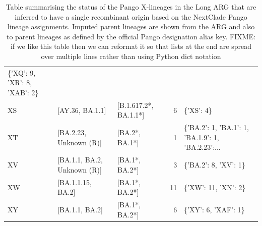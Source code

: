 \documentclass{article}
\begin{document}
\begin{table}
\begin{tabular}{lllrl}
\{'XQ': 9, 'XR': 8, 'XAB': 2\} \\
XS      &              [AY.36, BA.1.1] &  [B.1.617.2*, BA.1.1*] &   6 &
\{'XS': 4\} \\
XT      &       [BA.2.23, Unknown (R)] &         [BA.2*, BA.1*] &   1 &
\{'BA.2': 1, 'BA.1': 1, 'BA.1.9': 1, 'BA.2.23':... \\
XV      &  [BA.1.1, BA.2, Unknown (R)] &         [BA.1*, BA.2*] &   3 &
\{'BA.2': 8, 'XV': 1\} \\
XW      &            [BA.1.1.15, BA.2] &         [BA.1*, BA.2*] &  11 &
\{'XW': 11, 'XN': 2\} \\
XY      &               [BA.1.1, BA.2] &         [BA.1*, BA.2*] &   6 &
\{'XY': 6, 'XAF': 1\} \\
\bottomrule
\end{tabular}
\caption{\label{tab:pango-single-origin}
Table summarising the status of the Pango X-lineages in the Long ARG that are inferred to have a single recombinant origin based on the NextClade Pango lineage assignments. Imputed parent lineages are shown from the ARG and also to parent lineages as defined by the official Pango designation alias key. FIXME: if we like this table then we can reformat it so that lists at the end are spread over multiple lines rather than using Python dict notation }
\end{table}
\end{document}
